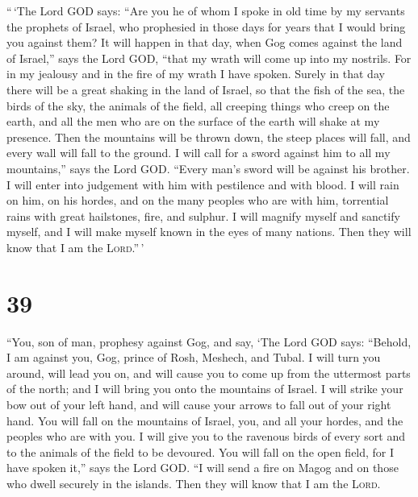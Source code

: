  ``\,`The Lord GOD says: ``Are you he of whom I spoke in
old time by my servants the prophets of Israel, who prophesied in those
days for years that I would bring you against them?  It
will happen in that day, when Gog comes against the land of Israel,''
says the Lord GOD, ``that my wrath will come up into my nostrils.
 For in my jealousy and in the fire of my wrath I have
spoken. Surely in that day there will be a great shaking in the land of
Israel,  so that the fish of the sea, the birds of the
sky, the animals of the field, all creeping things who creep on the
earth, and all the men who are on the surface of the earth will shake at
my presence. Then the mountains will be thrown down, the steep places
will fall, and every wall will fall to the ground.  I
will call for a sword against him to all my mountains,'' says the Lord
GOD. ``Every man's sword will be against his brother.  I
will enter into judgement with him with pestilence and with blood. I
will rain on him, on his hordes, and on the many peoples who are with
him, torrential rains with great hailstones, fire, and sulphur.
 I will magnify myself and sanctify myself, and I will
make myself known in the eyes of many nations. Then they will know that
I am the \textsc{Lord}.''\,'

\hypertarget{section-38}{%
\section{39}\label{section-38}}

 ``You, son of man, prophesy against Gog, and say, `The
Lord GOD says: ``Behold, I am against you, Gog, prince of Rosh, Meshech,
and Tubal.  I will turn you around, will lead you on, and
will cause you to come up from the uttermost parts of the north; and I
will bring you onto the mountains of Israel.  I will
strike your bow out of your left hand, and will cause your arrows to
fall out of your right hand.  You will fall on the
mountains of Israel, you, and all your hordes, and the peoples who are
with you. I will give you to the ravenous birds of every sort and to the
animals of the field to be devoured.  You will fall on the
open field, for I have spoken it,'' says the Lord GOD. 
``I will send a fire on Magog and on those who dwell securely in the
islands. Then they will know that I am the \textsc{Lord}.

